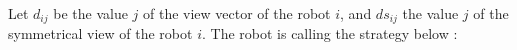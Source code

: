 \documentclass{article}
\begin{document}

Let $d_{ij}$ be the value $j$ of the view vector of the robot $i$, and $ds_{ij}$ the value $j$ of the symmetrical view of the
robot $i$.
The robot is calling the strategy below :
\end{document}
